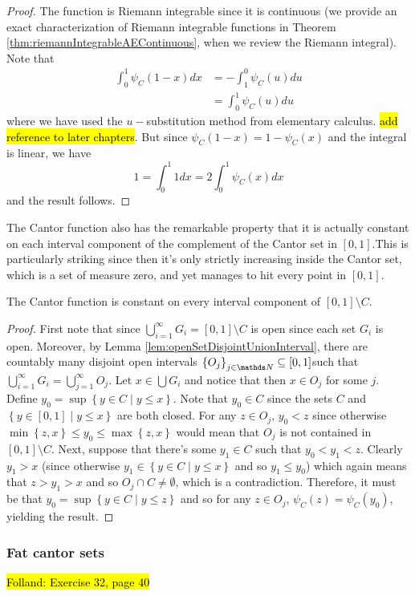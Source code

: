 \begin{proof}
The function is Riemann integrable since it is continuous (we provide
an exact characterization of Riemann integrable functions in Theorem
\ref{thm:riemannIntegrableAEContinuous}, when we review the Riemann
integral). Note that 
\begin{align*}
\int_{0}^{1}\psi_{C}\left(1-x\right)dx & =-\int_{1}^{0}\psi_{C}\left(u\right)du\\
 & =\int_{0}^{1}\psi_{C}\left(u\right)du
\end{align*}
where we have used the $u-$substitution method from elementary calculus.
\hl{add reference to later chapters}. But since $\psi_{C}\left(1-x\right)=1-\psi_{C}\left(x\right)$
and the integral is linear, we have
\[
1=\int_{0}^{1}1dx=2\int_{0}^{1}\psi_{C}\left(x\right)dx
\]
 and the result follows.
\end{proof}
The Cantor function also has the remarkable property that it is actually
constant on each interval component of the complement of the Cantor
set in $\left[0,1\right].$This is particularly striking since then
it's only strictly increasing inside the Cantor set, which is a set
of measure zero, and yet manages to hit every point in $\left[0,1\right].$
\begin{prop}
\label{prop:cantorFunctionConstantOutside}The Cantor function is
constant on every interval component of $\left[0,1\right]\setminus C.$
\end{prop}

\begin{proof}
First note that since $\bigcup_{i=1}^{\infty}G_{i}=\left[0,1\right]\setminus C$
is open since each set $G_{i}$ is open. Moreover, by Lemma \ref{lem:openSetDisjointUnionInterval},
there are countably many disjoint open intervals $\left\{ O_{j}\right\} _{j\in\N}\subseteq\left[0,1\right]$such
that $\bigcup_{i=1}^{\infty}G_{i}=\bigcup_{j=1}^{\infty}O_{j}$. Let
$x\in\bigcup G_{i}$ and notice that then $x\in O_{j}$ for some $j.$
Define $y_{0}=\sup\left\{ y\in C\mid y\leq x\right\} $. Note that
$y_{0}\in C$ since the sets $C$ and $\left\{ y\in\left[0,1\right]\mid y\leq x\right\} $
are both closed. For any $z\in O_{j}$, $y_{0}<z$ since otherwise
$\min\left\{ z,x\right\} \leq y_{0}\leq\max\left\{ z,x\right\} $
would mean that $O_{j}$ is not contained in $\left[0,1\right]\setminus C$.
Next, suppose that there's some $y_{1}\in C$ such that $y_{0}<y_{1}<z$.
Clearly $y_{1}>x$ (since otherwise $y_{1}\in\left\{ y\in C\mid y\leq x\right\} $
and so $y_{1}\leq y_{0}$) which again means that $z>y_{1}>x$ and
so $O_{j}\cap C\neq\emptyset$, which is a contradiction. Therefore,
it must be that $y_{0}=\sup\left\{ y\in C\mid y\leq z\right\} $ and
so for any $z\in O_{j}$, $\psi_{C}\left(z\right)=\psi_{C}\left(y_{0}\right)$,
yielding the result.
\end{proof}

\subsubsection{Fat cantor sets}

\hl{Folland: Exercise 32, page 40}
